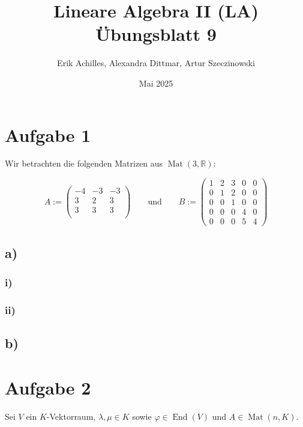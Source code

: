 \documentclass{article}
\title{Lineare Algebra II (LA) Übungsblatt 9}
\author{Erik Achilles, Alexandra Dittmar, Artur Szeczinowski}
\date{Mai 2025}
\newcommand{\RR}{\mathbb{R}}
\DeclareMathOperator{\Mat}{Mat}
\DeclareMathOperator{\End}{End}
\begin{document}

\section*{Aufgabe 1}

Wir betrachten die folgenden Matrizen aus
$\Mat(3, \RR)$:

\[
  A := \left(
  \begin{array}{ccc}
      -4 & -3 & -3 \\
      3  & 2  & 3  \\
      3  & 3  & 3  \\
    \end{array}
  \right)
  \qquad \text{und} \qquad
  B := \left(
  \begin{array}{ccc|ccc}
      1 & 2 & 3 & 0 & 0 \\
      0 & 1 & 2 & 0 & 0 \\
      0 & 0 & 1 & 0 & 0 \\ \hline
      0 & 0 & 0 & 4 & 0 \\
      0 & 0 & 0 & 5 & 4
    \end{array}
  \right)
\]

\subsection*{a)}

\subsubsection*{i)}

\subsubsection*{ii)}

\subsection*{b)}

\newpage

\section*{Aufgabe 2}

Sei $V$ ein $K$-Vektorraum,
$\lambda, \mu \in K$
sowie
$\varphi \in \End(V)$
und
$A \in \Mat(n, K)$.
\end{document}
